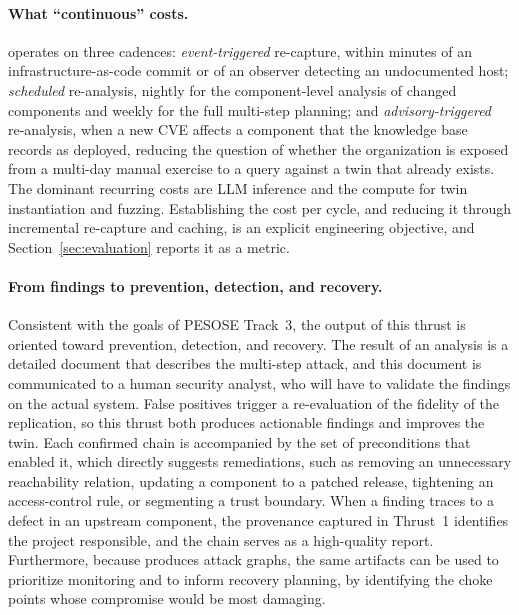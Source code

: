 \paragraph{What ``continuous'' costs.}
\sysname operates on three cadences:
\emph{event-triggered} re-capture, within minutes of an
infrastructure-as-code commit or of an observer detecting an undocumented
host; \emph{scheduled} re-analysis, nightly for the component-level analysis
of changed components and weekly for the full multi-step planning; and
\emph{advisory-triggered} re-analysis, when a new CVE affects a component
that the knowledge base records as deployed, reducing the question of whether
the organization is exposed from a multi-day manual exercise to a
query against a twin that already exists. The dominant recurring costs are LLM inference and the compute for twin
instantiation and fuzzing. Establishing the cost per cycle, and reducing it
through incremental re-capture and caching, is an explicit engineering
objective, and Section~\ref{sec:evaluation} reports it as a metric.

\paragraph{From findings to prevention, detection, and recovery.}
Consistent with the goals of PESOSE Track~3, the output of this thrust is oriented toward prevention, detection, and
recovery. The result of an analysis is a detailed document that describes the
multi-step attack, and this document is communicated to a human security
analyst, who will have to validate the findings on the actual system. False positives trigger a re-evaluation of the fidelity of the replication, so
this thrust both produces actionable findings and improves the twin. Each confirmed chain is accompanied by the
set of preconditions that enabled it, which directly suggests remediations,
such as removing an unnecessary reachability relation, updating a component
to a patched release, tightening an access-control rule, or segmenting a
trust boundary. When a finding traces to a defect in an upstream component,
the provenance captured in Thrust~1 identifies the project responsible, and
the chain serves as a high-quality report. Furthermore, because \sysname
produces attack graphs, the same artifacts can be used to prioritize
monitoring and to inform recovery planning, by identifying the choke points
whose compromise would be most damaging.
